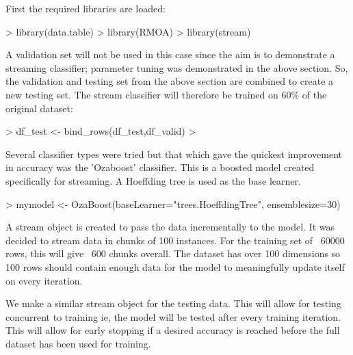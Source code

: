 \documentclass[10pt]{article}
\begin{document}
First the required libraries are loaded:
\begin{Schunk}
\begin{Sinput}
> library(data.table)
> library(RMOA)
> library(stream)
\end{Sinput}
\end{Schunk}

A validation set will not be used in this case since the aim is to demonstrate a streaming classifier; parameter tuning was demonstrated in the above section. So, the validation and testing set from the above section are combined to create a new testing set. The stream classifier will therefore be trained on 60\% of the original dataset:
\begin{Schunk}
\begin{Sinput}
> df_test <- bind_rows(df_test,df_valid)
> 
\end{Sinput}
\end{Schunk}
Several classifier types were tried but that which gave the quickest improvement in accuracy was the 'Ozaboost' classifier. This is a boosted model created specifically for streaming. A Hoeffding tree is used as the base learner.
\begin{Schunk}
\begin{Sinput}
> mymodel <- OzaBoost(baseLearner="trees.HoeffdingTree", ensemblesize=30)
\end{Sinput}
\end{Schunk}
A stream object is created to pass the data incrementally to the model. It was decided to stream data in chunks of 100 instances. For the training set of ~60000 rows, this will give ~600 chunks overall. The dataset has over 100 dimensions so 100 rows should contain enough data for the model to meaningfully update itself on every iteration.
\begin{Schunk}
\end{Schunk}
We make a similar stream object for the testing data. This will allow for testing concurrent to training ie, the model will be tested after every training iteration. This will allow for early stopping if a desired accuracy is reached before the full dataset has been used for training.\\
\end{document}
